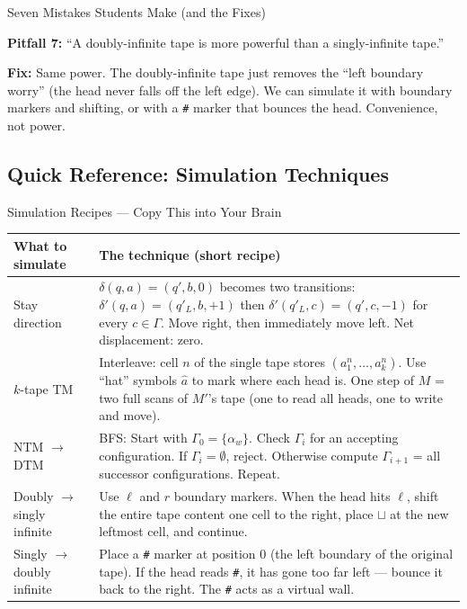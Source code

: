 \begin{notebox}{Seven Mistakes Students Make (and the Fixes)}
\medskip

\textbf{Pitfall 7:} ``A doubly-infinite tape is more powerful than a singly-infinite tape.''

\textbf{Fix:} Same power. The doubly-infinite tape just removes the ``left boundary worry'' (the head never falls off the left edge). We can simulate it with boundary markers and shifting, or with a \texttt{\#} marker that bounces the head. Convenience, not power.
\end{notebox}

\subsection{Quick Reference: Simulation Techniques}

\begin{definitionbox}{Simulation Recipes --- Copy This into Your Brain}
\begin{center}
\renewcommand{\arraystretch}{1.6}
\begin{tabular}{p{2.8cm}p{11.5cm}}
\toprule
\textbf{What to simulate} & \textbf{The technique (short recipe)} \\
\midrule
Stay direction & $\delta(q,a) = (q',b,0)$ becomes two transitions: $\delta'(q,a) = (q'_L, b, +1)$ then $\delta'(q'_L, c) = (q', c, -1)$ for every $c \in \Gamma$. Move right, then immediately move left. Net displacement: zero. \\
$k$-tape TM & Interleave: cell $n$ of the single tape stores $(a_1^n, \ldots, a_k^n)$. Use ``hat'' symbols $\hat{a}$ to mark where each head is. One step of $M$ = two full scans of $M'$'s tape (one to read all heads, one to write and move). \\
NTM $\to$ DTM & BFS: Start with $\Gamma_0 = \{\alpha_w\}$. Check $\Gamma_i$ for an accepting configuration. If $\Gamma_i = \emptyset$, reject. Otherwise compute $\Gamma_{i+1}$ = all successor configurations. Repeat. \\
Doubly $\to$ singly infinite & Use $\ell$ and $r$ boundary markers. When the head hits $\ell$, shift the entire tape content one cell to the right, place $\sqcup$ at the new leftmost cell, and continue. \\
Singly $\to$ doubly infinite & Place a \texttt{\#} marker at position 0 (the left boundary of the original tape). If the head reads \texttt{\#}, it has gone too far left --- bounce it back to the right. The \texttt{\#} acts as a virtual wall. \\
\bottomrule
\end{tabular}
\end{center}

\end{definitionbox}

